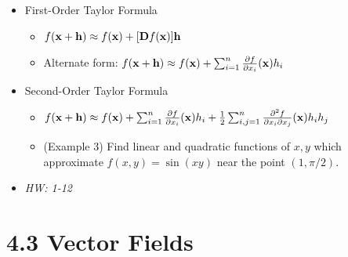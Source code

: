 \documentclass[11pt]{article}
\begin{document}
\begin{itemize}
  \item First-Order Taylor Formula
    \begin{itemize}
      \item
        \(
          f(\mathbf{x} + \mathbf{h})
            \approx
          f(\mathbf{x}) + [\mathbf{D}f(\mathbf{x})]\mathbf{h}
        \)
      \item Alternate form:
        \(
          f(\mathbf{x} + \mathbf{h})
            \approx
          f(\mathbf{x})
            +
          \sum_{i=1}^{n}\frac{\partial f}{\partial x_i}(\mathbf{x})h_i
        \)
    \end{itemize}
  \item Second-Order Taylor Formula
    \begin{itemize}
      \item
        \(
          f(\mathbf{x} + \mathbf{h})
            \approx
          f(\mathbf{x})
            +
          \sum_{i=1}^{n}\frac{\partial f}{\partial x_i}(\mathbf{x})h_i
            +
          \frac{1}{2}
          \sum_{i,j=1}^{n}\frac{\partial^2 f}{\partial x_i\partial x_j}(\mathbf{x})h_ih_j
        \)
      \item
        (Example 3) Find linear and quadratic functions of \(x,y\) which
        approximate \(f(x,y)=\sin(xy)\) near the point \((1,\pi/2)\).
    \end{itemize}
  \item\textit{
    HW: 1-12
  }
\end{itemize}


\section*{4.3 Vector Fields}
\end{document}
